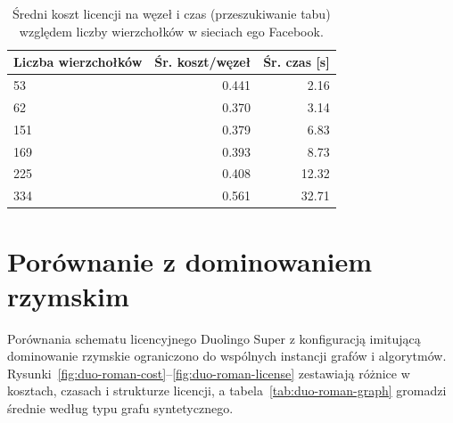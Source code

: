 \begin{table}[H]
  \centering
  \caption{Średni koszt licencji na węzeł i czas (przeszukiwanie tabu) względem liczby wierzchołków w sieciach ego Facebook.}
  \label{tab:duo-real-size-table}
  \begin{tabular}{lrr}
    \toprule
    \textbf{Liczba wierzchołków} & \textbf{Śr. koszt/węzeł} & \textbf{Śr. czas [s]} \\
    \midrule
    53                           & 0.441                    & 2.16                  \\
    62                           & 0.370                    & 3.14                  \\
    151                          & 0.379                    & 6.83                  \\
    169                          & 0.393                    & 8.73                  \\
    225                          & 0.408                    & 12.32                 \\
    334                          & 0.561                    & 32.71                 \\
    \bottomrule
  \end{tabular}
\end{table}


\section{Porównanie z dominowaniem rzymskim}

Porównania schematu licencyjnego Duolingo Super z konfiguracją imitującą dominowanie rzymskie ograniczono do wspólnych instancji grafów i algorytmów. Rysunki~\ref{fig:duo-roman-cost}--\ref{fig:duo-roman-license} zestawiają różnice w kosztach, czasach i strukturze licencji, a tabela~\ref{tab:duo-roman-graph} gromadzi średnie według typu grafu syntetycznego.

